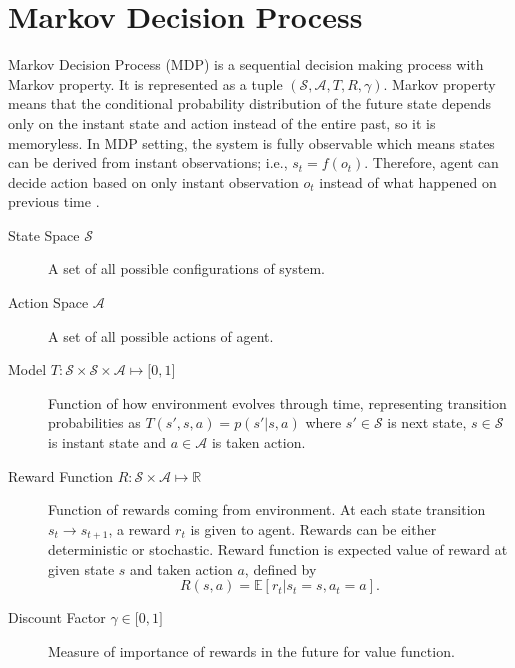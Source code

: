 \section{Markov Decision Process}
\label{sec:mdp}

Markov Decision Process (MDP) is a sequential decision making process with Markov property. 
It is represented as a tuple $(\mathcal{S},\mathcal{A},T,R,\gamma)$. 
Markov property means that the conditional probability distribution of the future state depends only on the instant state and action instead of the entire past, so it is memoryless. 
In MDP setting, the system is fully observable which means states can be derived from instant observations; i.e., $s_t=f(o_t)$. 
Therefore, agent can decide action based on only instant observation $o_t$ instead of what happened on previous time \cite{francois-lavet_introduction_2018}. 

\begin{description}
	\item[State Space $\mathcal{S}$] A set of all possible configurations of system. 
	
	\item[Action Space $\mathcal{A}$]  A set of all possible actions of agent. 
	
	\item[Model $T \colon \mathcal{S} \times \mathcal{S} \times \mathcal{A} \mapsto \lbrack 0,1 \rbrack$] Function of how environment evolves through time, representing transition probabilities as $T(s',s,a) = p(s'|s,a)$ 
	where $s' \in \mathcal{S}$ is next state, $s \in \mathcal{S}$ is instant state and $a \in \mathcal{A}$ is taken action.
	
	\item[Reward Function $R \colon \mathcal{S} \times \mathcal{A} \mapsto \mathbb{R}$] Function of rewards coming from environment. 
	At each state transition $s_t \rightarrow s_{t+1}$, a reward $r_t$ is given to agent. 
	Rewards can be either deterministic or stochastic. 
	Reward function is expected value of reward at given state $s$ and taken action $a$, defined by 
	\begin{equation}
	R(s,a) = \mathbb{E}[r_t|s_t=s, a_t=a]. %
	\end{equation}
	
	\item[Discount Factor $\gamma \in \lbrack 0,1 \rbrack$] Measure of importance of rewards in the future for value function.
\end{description}
